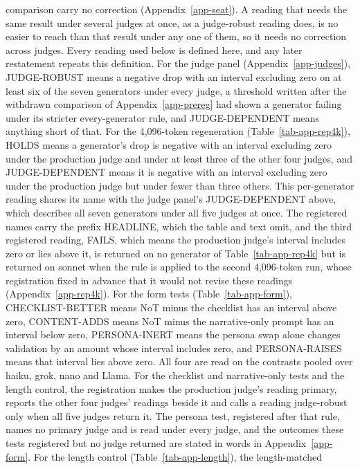 comparison carry no correction (Appendix~\ref{app-seat}). A reading that
needs the same result under several judges at once, as a judge-robust reading
does, is no easier to reach than that result under any one of them, so it
needs no correction across judges.
Every reading used below is defined here, and any later restatement repeats
this definition.
For the
judge panel (Appendix~\ref{app-judges}), JUDGE-ROBUST means a negative drop
with an interval excluding zero on at least six of the seven generators under
every judge, a threshold written after the withdrawn comparison of
Appendix~\ref{app-prereg} had shown a generator failing under its stricter
every-generator rule, and JUDGE-DEPENDENT means anything short of that.
For the 4,096-token regeneration (Table~\ref{tab-app-rep4k}), HOLDS means a
generator's drop is negative with an interval excluding zero under the
production judge and under at least three of the other four judges, and
JUDGE-DEPENDENT means it is negative with an interval excluding zero under
the production judge but under fewer than three others. This per-generator
reading shares its name with the judge panel's JUDGE-DEPENDENT above, which
describes all seven generators under all five judges at once. The registered
names carry the prefix HEADLINE, which the table and text omit, and the third
registered reading, FAILS, which means the production judge's interval
includes zero or lies above it, is returned on no generator of
Table~\ref{tab-app-rep4k} but is returned on sonnet when the rule is applied
to the second 4,096-token run, whose registration fixed in advance that it
would not revise these readings (Appendix~\ref{app-rep4k}).
For the form tests (Table~\ref{tab-app-form}), CHECKLIST-BETTER means NoT
minus the checklist has an interval above zero, CONTENT-ADDS means NoT minus
the narrative-only prompt has an interval below zero, PERSONA-INERT means the
persona swap alone changes validation by an amount whose interval includes
zero, and PERSONA-RAISES means that interval lies above zero.
All four are read on the contrasts pooled over haiku, grok, nano and Llama.
For the checklist and narrative-only tests and the length control, the
registration makes the production judge's reading primary, reports the other
four judges' readings beside it and calls a reading judge-robust only when all
five judges return it. The persona test, registered after that rule, names no
primary judge and is read under every judge, and the outcomes these tests
registered but no judge returned are stated in words in
Appendix~\ref{app-form}.
For the length control (Table~\ref{tab-app-length}), the length-matched
